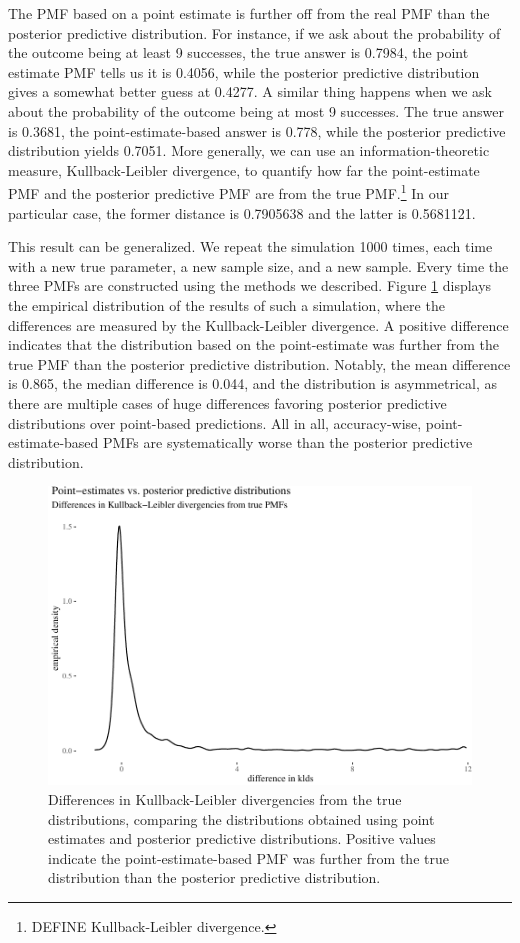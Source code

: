 \documentclass[
  10pt,
  dvipsnames,enabledeprecatedfontcommands]{scrartcl}
\begin{document}
The PMF based on a point estimate is further off from the real PMF than
the posterior predictive distribution. For instance, if we ask about the
probability of the outcome being at least 9 successes, the true answer
is 0.7984, the point estimate PMF tells us it is 0.4056, while the
posterior predictive distribution gives a somewhat better guess at
0.4277. A similar thing happens when we ask about the probability of the
outcome being at most 9 successes. The true answer is 0.3681, the
point-estimate-based answer is 0.778, while the posterior predictive
distribution yields 0.7051. More generally, we can use an
information-theoretic measure, Kullback-Leibler divergence, to quantify
how far the point-estimate PMF and the posterior predictive PMF are from
the true PMF.\footnote{DEFINE Kullback-Leibler divergence.} In our
particular case, the former distance is 0.7905638 and the latter is
0.5681121.

This result can be generalized. We repeat the simulation 1000 times,
each time with a new true parameter, a new sample size, and a new
sample. Every time the three PMFs are constructed using the methods we
described. Figure \ref{fig:kldsPlots} displays the empirical
distribution of the results of such a simulation, where the differences
are measured by the Kullback-Leibler divergence. A positive difference
indicates that the distribution based on the point-estimate was further
from the true PMF than the posterior predictive distribution. Notably,
the mean difference is 0.865, the median difference is 0.044, and the
distribution is asymmetrical, as there are multiple cases of huge
differences favoring posterior predictive distributions over point-based
predictions. All in all, accuracy-wise, point-estimate-based PMFs are
systematically worse than the posterior predictive distribution.

\begin{figure}[H]

\begin{center}\includegraphics[width=0.7\linewidth]{chapter-outline_files/figure-latex/fig:kldsPlots-1} \end{center}
\caption{Differences in Kullback-Leibler divergencies from the true distributions, comparing the distributions obtained using point estimates and posterior predictive distributions. Positive values indicate the point-estimate-based PMF was further from the true distribution than the posterior predictive distribution.}
\label{fig:kldsPlots}
\end{figure}
\end{document}
